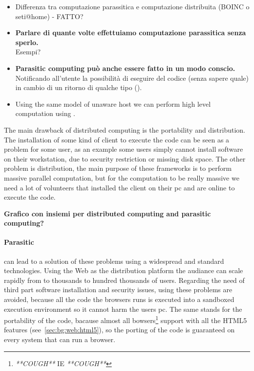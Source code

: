 \begin{itemize}
	\item Differenza tra computazione parassitica e computazione distribuita (BOINC o seti@home) - FATTO?
	
	\item \textbf{Parlare di quante volte effettuiamo computazione parassitica senza sperlo.}\\Esempi?

	\item \textbf{Parasitic computing può anche essere fatto in un modo conscio.} Notificando
	all'utente la possibilità di eseguire del codice (senza sapere quale) in cambio di un ritorno di qualche
	tipo (\cite{karame2011pay}).

	\item Using the same model of unaware host we can perform high level computation using
	\js{}.
\end{itemize}

The main drawback of distributed computing is the portability and distribution.
The installation of some kind of client to execute the code can be seen as a problem for some
user, as an example some users simply cannot install software on their workstation, due to security
restriction or missing disk space. The other problem is distribution, the main purpose of these
frameworks is to perform massive parallel computation, but for the computation to be really 
massive we need a lot of volunteers that installed the client on their pc and are online to execute
the code.

{\bf Grafico con insiemi per distributed computing and parasitic computing?}

\paragraph{Parasitic \js{}} can lead to a solution of these problems using a widespread
and standard technologies. Using the Web as the distribution platform the audiance can scale
rapidly from to thousands to hundred thousands of users. Regarding the need of third part software
installation and security issues, using \js{} these problems are avoided, because all the code the browsers
runs is executed into a sandboxed execution environment so it cannot harm the users pc. The same stands
for the portability of the code, bacause almost all bowsers\footnote{\emph{**COUGH**} IE \emph{**COUGH**}} support
\js{} with all the HTML5 features (see~\vref{sec:bg:web:html5}), so the porting of the code
is guaranteed on every system that can run a browser.


